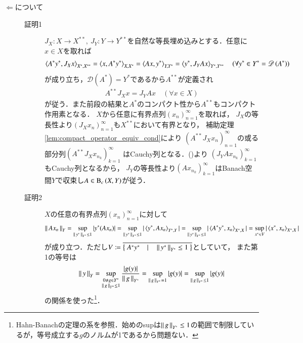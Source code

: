 \begin{prf}
\begin{description}
			\item[$\Leftarrow$について]\mbox{}
				\begin{description}
					\item[証明1]
						$J_X:X \longrightarrow X^{**},\ J_Y:Y \longrightarrow Y^{**}$を自然な等長埋め込みとする．任意に$x \in X$を取れば
						\begin{align}
							\inprod<A^*y^*, J_Xx>_{X^*,X^{**}} = \inprod<x,A^*y^*>_{X,X^*} = \inprod<Ax,y^*>_{Y,Y^*} = \inprod<y^*,J_YAx>_{Y^*,Y^{**}} \quad (\forall y^* \in Y^*=\Dom{A^*} )
						\end{align}
						が成り立ち，$\mathscr{D}(A^*)=Y^*$であるから$A^{**}$が定義され
						\begin{align}
							A^{**} J_X x = J_Y A x \quad (\forall x \in X)
							\label{eq:thm_dual_operator_of_compact_operators}
						\end{align}
						が従う．また前段の結果と$A^*$のコンパクト性から$A^{**}$もコンパクト作用素となる．
						$X$から任意に有界点列$(x_n)_{n=1}^{\infty}$を取れば，
						$J_X$の等長性より$\left(J_Xx_n\right)_{n=1}^{\infty}$も$X^{**}$において有界となり，
						補助定理\ref{lem:compact_operator_equiv_cond}により
						$\left(A^{**}J_Xx_n\right)_{n=1}^{\infty}$の或る部分列$\left(A^{**}J_Xx_{n_k}\right)_{k=1}^{\infty}$
						はCauchy列となる．()より
						$\left(J_YAx_{n_k}\right)_{k=1}^{\infty}$もCauchy列となるから，
						$J_Y$の等長性より$\left(Ax_{n_k}\right)_{k=1}^{\infty}$はBanach空間$Y$で収束し$A \in \mathrm{B}_c\left(X,Y\right) $が従う．
					\item[証明2]
						$X$の任意の有界点列$(x_n)_{n=1}^{\infty}$に対して
						\begin{align}
							\Norm{Ax_n}{Y} = \sup{\Norm{y^*}{Y^*} \leq 1}{|y^*(Ax_n)|}
							= \sup{\Norm{y^*}{Y^*} \leq 1}{|\inprod<y^*,Ax_n>_{Y^*,Y}|}
							= \sup{\Norm{y^*}{Y^*} \leq 1}{|\inprod<A^*y^*,x_n>_{X^*,X}|}
							= \sup{x^* \in V}{|\inprod<x^*,x_n>_{X^*,X}|}
						\end{align}
						が成り立つ．ただし$V \coloneqq \closure{\left\{\ A^*y^*\quad |\quad \Norm{y^*}{Y^*} \leq 1\ \right\}}$としていて，
						また第1の等号は
						\begin{align}
							\left\|\, y\, \right\|_{Y} = \operatorname*{sup}_{\substack{0 \neq g \in Y^* \\ \left\|\, g\, \right\|_{Y^*}\leq1}} \frac{|g(y)|}{\left\|\, g\, \right\|_{Y^*}} 
							= \operatorname*{sup}_{\left\|\, g\, \right\|_{Y^*}=1} |g(y)| = \operatorname*{sup}_{\left\|\, g\, \right\|_{Y^*} \leq 1} |g(y)|
						\end{align}
						の関係を使った\footnote{Hahn-Banachの定理の系を参照．始めのsupは$\left\|\, g\, \right\|_{Y^*}\leq1$の範囲で制限しているが，等号成立する$g$のノルムが1であるから問題ない．}．

\end{description}
\end{description}
\end{prf}
